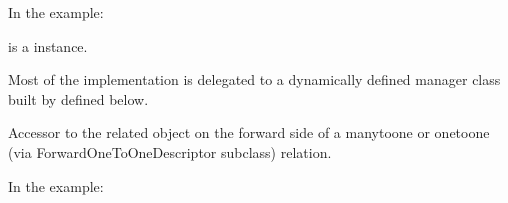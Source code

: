 \documentclass[letterpaper,10pt,english]{sphinxmanual}
\begin{document}
\begin{fulllineitems}
\begin{fulllineitems}
In the example:

\begin{sphinxVerbatim}[commandchars=\\\{\}]
 
       
\end{sphinxVerbatim}

 is a  instance.

Most of the implementation is delegated to a dynamically defined manager
class built by  defined below.

\end{fulllineitems}


\begin{fulllineitems}
\label{\detokenize{forums:forums.models.Comment2.objects}}
\end{fulllineitems}


\begin{fulllineitems}
\label{\detokenize{forums:forums.models.Comment2.post}}
Accessor to the related object on the forward side of a many\sphinxhyphen{}to\sphinxhyphen{}one or
one\sphinxhyphen{}to\sphinxhyphen{}one (via ForwardOneToOneDescriptor subclass) relation.

In the example:

\begin{sphinxVerbatim}[commandchars=\\\{\}]
 
       
\end{sphinxVerbatim}


\end{fulllineitems}
\end{fulllineitems}
\end{document}
